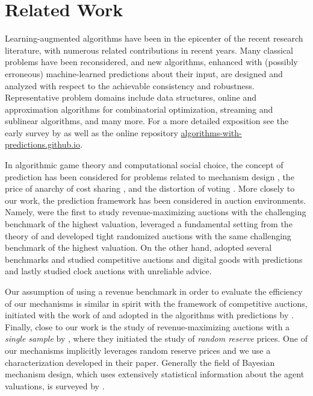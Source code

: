 \section{Related Work}
Learning-augmented algorithms have been in the epicenter of the recent research literature, with numerous related contributions in recent years. Many classical problems have been reconsidered, and new algorithms, enhanced with (possibly erroneous) machine-learned predictions about their input, are designed and analyzed with respect to the achievable consistency and robustness. Representative problem domains include data structures, online and approximation algorithms for combinatorial optimization, streaming and sublinear algorithms, and many more. For a more detailed exposition see the early survey by \cite{mitzenmacher2022algorithms} as well as the online repository \url{algorithms-with-predictions.github.io}.

In algorithmic game theory and computational social choice, the concept of prediction has been considered for problems related to mechanism design \citep{agrawal2022learning,BGT23,balkanski2023online,balkanski2024randomized,colini2024trust,christodoulou2024mechanism}, the price of anarchy of cost sharing \citep{gkatzelis2022improved}, and the distortion of voting \citep{berger2023optimal}. More closely to our work, the prediction framework has been considered in auction environments. Namely, \cite{XL22} were the first to study revenue-maximizing auctions with the challenging benchmark of the highest valuation, \cite{caragiannis2024randomized} leveraged a fundamental setting from the theory of \cite{myerson1981optimal} and developed tight randomized auctions with the same challenging benchmark of the highest valuation. On the other hand, \cite{lu2024competitive} adopted several benchmarks and studied competitive auctions and digital goods with predictions and lastly \cite{gkatzelis2025clock} studied clock auctions with unreliable advice.

Our assumption of using a revenue benchmark in order to evaluate the efficiency of our mechanisms is similar in spirit with the framework of competitive auctions, initiated with the work of \cite{goldberg2006competitive} and adopted in the algorithms with predictions by \cite{lu2024competitive}. Finally, close to our work is the study of revenue-maximizing auctions with a \textit{single sample} by \cite{dhangwatnotai2010revenue}, where they initiated the study of \textit{random reserve} prices. One of our mechanisms implicitly leverages random reserve prices and we use a characterization developed in their paper. Generally the field of Bayesian mechanism design, which uses extensively statistical information about the agent valuations, is surveyed by \cite{hartline2013mechanism}.